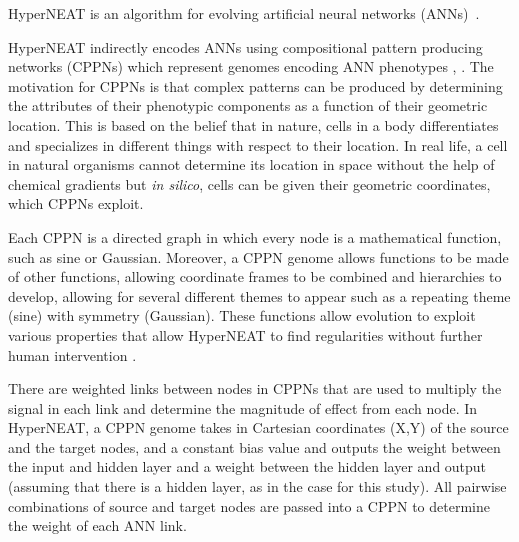 HyperNEAT is an algorithm for evolving artificial neural networks (ANNs)~\cite{stanley2002evolving}.

HyperNEAT indirectly encodes ANNs using compositional pattern producing networks (CPPNs) which represent genomes encoding ANN phenotypes \cite{stanley2009hypercube}, \cite{stanley2007CPPN}. 
The motivation for CPPNs is that complex patterns can be produced by determining the attributes of their phenotypic components as a function of their geometric location. 
This is based on the belief that in nature, cells in a body differentiates and specializes in different things with respect to their location. 
In real life, a cell in natural organisms cannot determine its location in space without the help of chemical gradients but \emph{in silico}, cells can be given their geometric coordinates, which CPPNs exploit. 


Each CPPN is a directed graph in which every node is a mathematical function, such as sine or Gaussian. 
Moreover, a CPPN genome allows functions to be made of other functions, allowing coordinate frames to be combined and hierarchies to develop, allowing for several different themes to appear such as a repeating theme (sine) with symmetry (Gaussian). 
These functions allow evolution to exploit various properties that allow HyperNEAT to find regularities without further human intervention \cite{stanley2009hypercube,clune2009evolving}. %


There are weighted links between nodes in CPPNs that are used to multiply the signal in each link and determine the magnitude of effect from each node. 
In HyperNEAT, a CPPN genome takes in Cartesian coordinates (X,Y) of the source and the target nodes, and a constant bias value and outputs the weight between the input and hidden layer and a weight between the hidden layer and output (assuming that there is a hidden layer, as in the case for this study). 
All pairwise combinations of source and target nodes are passed into a CPPN to determine the weight of each ANN link. 



